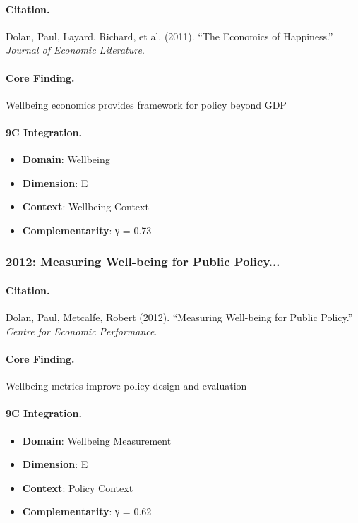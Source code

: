 \paragraph{Citation.}
Dolan, Paul, Layard, Richard, et al. (2011). ``The Economics of Happiness.''
\textit{Journal of Economic Literature}.

\paragraph{Core Finding.}
Wellbeing economics provides framework for policy beyond GDP

\paragraph{9C Integration.}
\begin{itemize}[nosep]
  \item \textbf{Domain}: Wellbeing
  \item \textbf{Dimension}: E
  \item \textbf{Context}: Wellbeing Context
  \item \textbf{Complementarity}: γ = 0.73
\end{itemize}

\subsubsection{2012: Measuring Well-being for Public Policy...}

\paragraph{Citation.}
Dolan, Paul, Metcalfe, Robert (2012). ``Measuring Well-being for Public Policy.''
\textit{Centre for Economic Performance}.

\paragraph{Core Finding.}
Wellbeing metrics improve policy design and evaluation

\paragraph{9C Integration.}
\begin{itemize}[nosep]
  \item \textbf{Domain}: Wellbeing Measurement
  \item \textbf{Dimension}: E
  \item \textbf{Context}: Policy Context
  \item \textbf{Complementarity}: γ = 0.62
\end{itemize}

